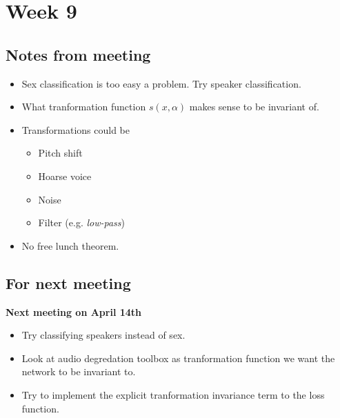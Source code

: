 
\section{Week 9}

\subsection{Notes from meeting}

\begin{itemize}
\item Sex classification is too easy a problem. Try speaker classification.
\item What tranformation function $s(x, \alpha)$ makes sense to be invariant of.
\item Transformations could be
\begin{itemize}
  \item Pitch shift
  \item Hoarse voice
  \item Noise
  \item Filter (e.g. \textit{low-pass})
\end{itemize}
\item No free lunch theorem.
\end{itemize}

\subsection{For next meeting}

\textbf{Next meeting on April 14th}

\begin{itemize}
\item Try classifying speakers instead of sex.
\item Look at audio degredation toolbox as tranformation function we want the network to be invariant to.
\item Try to implement the explicit tranformation invariance term to the loss function.
\end{itemize}
